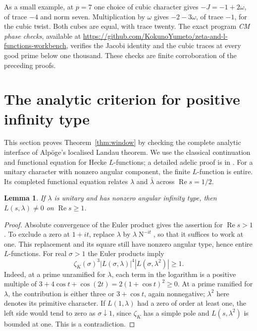 \documentclass[11pt]{article}
\newcommand{\workbenchurl}{https://github.com/KokunoYumeto/zeta-and-l-functions-workbench}
\newcommand{\N}{\operatorname{N}}
\newcommand{\Rea}{\operatorname{Re}}
\newtheorem{lemma}[theorem]{Lemma}
\theoremstyle{definition}
\theoremstyle{remark}
\begin{document}
As a small example, at $p=7$ one choice of cubic character gives
$-J=-1+2\omega$, of trace $-4$ and norm seven.  Multiplication by
$\omega$ gives $-2-3\omega$, of trace $-1$, for the cubic twist.
Both cubes are equal, with trace twenty.  The exact program
\emph{CM phase checks}, available at \url{\workbenchurl}, verifies
the Jacobi identity and the cubic traces at every good prime below one
thousand.  These checks are finite corroboration of the preceding proofs.

\section{The analytic criterion for positive infinity type}

This section proves Theorem~\ref{thm:window} by checking the complete
analytic interface of Alp\"oge's localised Landau theorem.
We use the classical continuation and functional equation for Hecke
$L$-functions; a detailed adelic proof is in
\cite[Theorem~4 and its proof, pp.~10--11; Corollary~2, p.~9]{Prasad}.
For a unitary character with nonzero angular component, the finite
$L$-function is entire.  Its completed functional equation relates
$\lambda$ and $\bar\lambda$ across $\Rea s=1/2$.

\begin{lemma}\label{lem:one}
If $\lambda$ is unitary and has nonzero angular infinity type, then
$L(s,\lambda)\ne0$ on $\Rea s\geq1$.
\end{lemma}

\begin{proof}
Absolute convergence of the Euler product gives the assertion for
$\Rea s>1$.  To exclude a zero at $1+it$, replace $\lambda$ by
$\lambda\N^{-it}$, so that it suffices to work at one.  This replacement
and its square still have nonzero angular type, hence entire
$L$-functions.  For real $\sigma>1$ the Euler products imply
\[
 \zeta_K(\sigma)^3|L(\sigma,\lambda)|^4
                      |L(\sigma,\lambda^2)|\geq1.
\]
Indeed, at a prime unramified for $\lambda$, each term in the logarithm
is a positive multiple of
$3+4\cos t+\cos(2t)=2(1+\cos t)^2\geq0$.
At a prime ramified for $\lambda$, the contribution is either three or
$3+\cos t$, again nonnegative; $\lambda^2$ here denotes its primitive
character.  If $L(1,\lambda)$ had a zero of order at least one, the left
side would tend to zero as $\sigma\downarrow1$, since $\zeta_K$ has a
simple pole and $L(s,\lambda^2)$ is bounded at one.  This is a
contradiction.
\end{proof}
\end{document}
